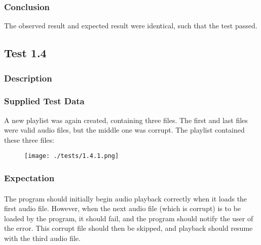 \subsubsection{Conclusion}
The observed result and expected result were identical, such that the test passed.


\pagebreak
\subsection{Test 1.4}
\subsubsection{Description}
\paragraph{}
{
	\centering
}

\subsubsection{Supplied Test Data}
A new playlist was again created, containing three files. The first and last files were valid audio files, but the middle one was corrupt. The playlist contained these three files:
\begin{figure}[H]
	\texttt{[image: ./tests/1.4.1.png]}
\end{figure}

\subsubsection{Expectation}
\paragraph{}
The program should initially begin audio playback correctly when it loads the first audio file. However, when the next audio file (which is corrupt) is to be loaded by the program, it should fail, and the program should notify the user of the error. This corrupt file should then be skipped, and playback should resume with the third audio file.
 
